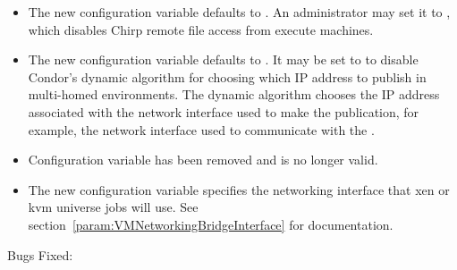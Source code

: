\begin{itemize}

\item The new configuration variable  
defaults to . 
An administrator may set it to , which 
disables Chirp remote file access from execute machines.

\item The new configuration variable
   defaults to .  It may
  be set to  to disable Condor's dynamic algorithm for choosing
  which IP address to publish in multi-homed environments.  The dynamic
  algorithm chooses the IP address associated with the network interface
  used to make the publication, for example, the network interface used 
  to communicate with the .

\item Configuration variable  has been removed
  and is no longer valid.

\item The new configuration variable
   specifies the networking interface
  that xen or kvm  universe jobs will use.
  See section~\ref{param:VMNetworkingBridgeInterface} for documentation.

\end{itemize}

\noindent Bugs Fixed:

